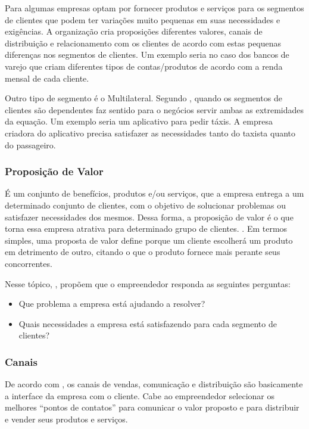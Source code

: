 Para  algumas empresas optam por fornecer produtos e serviços para os segmentos de clientes que podem ter variações muito pequenas em suas necessidades e exigências. A organização cria proposições diferentes valores, canais de distribuição e relacionamento com os clientes de acordo com estas pequenas diferenças nos segmentos de clientes. Um exemplo seria no caso dos bancos de varejo que criam diferentes tipos de contas/produtos de acordo com a renda mensal de cada cliente.

Outro tipo de segmento é o Multilateral. Segundo , quando os segmentos de clientes são dependentes faz sentido para o negócios servir ambas as extremidades da equação. Um exemplo seria um aplicativo para pedir táxis. A empresa criadora do aplicativo precisa satisfazer as necessidades tanto do taxista quanto do passageiro.

\subsubsection{Proposição de Valor}
\label{cha:proposicao_de_valor}
É um conjunto de benefícios, produtos e/ou serviços, que a empresa entrega a um determinado conjunto de clientes, com o objetivo de solucionar problemas ou satisfazer necessidades dos
mesmos. Dessa forma, a proposição de valor é o que torna essa empresa atrativa para
determinado grupo de clientes. \cite{businessmodel}. Em termos simples, uma proposta de valor define porque um cliente escolherá um produto em detrimento de outro, citando o que o produto fornece mais perante seus concorrentes.

Nesse tópico, , propõem que o empreendedor responda as seguintes perguntas:
\begin{itemize}
\item Que problema a empresa está ajudando a resolver?
\item Quais necessidades a empresa está satisfazendo para cada segmento de clientes?
\end{itemize}

\subsubsection{Canais}
\label{cha:canais}
De acordo com , os canais de vendas, comunicação e distribuição são basicamente a interface da empresa com o cliente. Cabe ao empreendedor selecionar os melhores \enquote{pontos de contatos} para comunicar o valor proposto e para distribuir e vender seus produtos e serviços.

